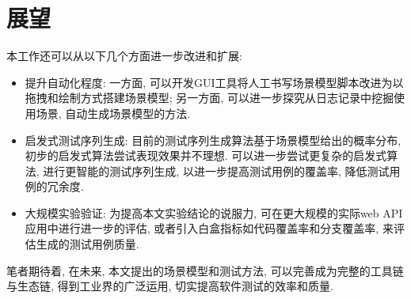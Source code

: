     \section{展望}
    
        本工作还可以从以下几个方面进一步改进和扩展:
        \begin{itemize}
            \item 提升自动化程度: 一方面, 可以开发GUI工具将人工书写场景模型脚本改进为以拖拽和绘制方式搭建场景模型; 另一方面, 可以进一步探究从日志记录中挖掘使用场景, 自动生成场景模型的方法.
            \item 启发式测试序列生成: 目前的测试序列生成算法基于场景模型给出的概率分布, 初步的启发式算法尝试表现效果并不理想. 可以进一步尝试更复杂的启发式算法, 进行更智能的测试序列生成, 以进一步提高测试用例的覆盖率, 降低测试用例的冗余度.
            \item 大规模实验验证: 为提高本文实验结论的说服力, 可在更大规模的实际web API应用中进行进一步的评估, 或者引入白盒指标如代码覆盖率和分支覆盖率, 来评估生成的测试用例质量.
        \end{itemize}
        
        笔者期待着, 在未来, 本文提出的场景模型和测试方法, 可以完善成为完整的工具链与生态链, 得到工业界的广泛运用, 切实提高软件测试的效率和质量.
